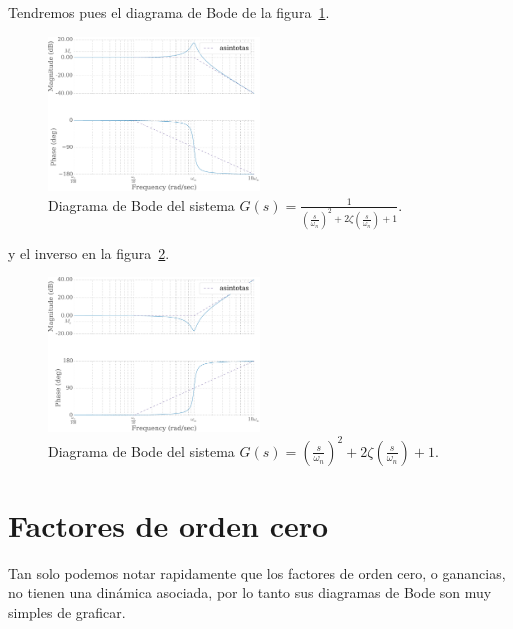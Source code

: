             Tendremos pues el diagrama de Bode de la figura~\ref{fig:bodesegundoorden}.

            \begin{figure}
                \centering
                \includegraphics[width=0.5\textwidth]{./imagenes/bodesegundoorden.pdf}
                \caption{\label{fig:bodesegundoorden}Diagrama de Bode del sistema $G(s) = \frac{1}{\left( \frac{s}{\omega_n} \right)^2 + 2 \zeta \left( \frac{s}{\omega_n} \right) + 1}$.}
            \end{figure}

            y el inverso en la figura~\ref{fig:bodesegundoordeninverso}.

            \begin{figure}
                \centering
                \includegraphics[width=0.5\textwidth]{./imagenes/bodesegundoordeninverso.pdf}
                \caption{\label{fig:bodesegundoordeninverso}Diagrama de Bode del sistema $G(s) = \left( \frac{s}{\omega_n} \right)^2 + 2 \zeta \left( \frac{s}{\omega_n} \right) + 1$.}
            \end{figure}


    \newpage
    \section{Factores de orden cero}
        Tan solo podemos notar rapidamente que los factores de orden cero, o ganancias, no tienen una dinámica asociada, por lo tanto sus diagramas de Bode son muy simples de graficar.


